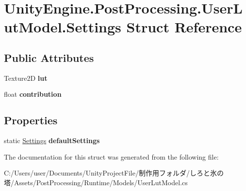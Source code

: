 \hypertarget{struct_unity_engine_1_1_post_processing_1_1_user_lut_model_1_1_settings}{}\section{Unity\+Engine.\+Post\+Processing.\+User\+Lut\+Model.\+Settings Struct Reference}
\label{struct_unity_engine_1_1_post_processing_1_1_user_lut_model_1_1_settings}
\subsection*{Public Attributes}
\begin{DoxyCompactItemize}
\item 
\mbox{\label{struct_unity_engine_1_1_post_processing_1_1_user_lut_model_1_1_settings_aacc55b006872312dfb56a19ec8b5e68a}} 
Texture2D {\bfseries lut}
\item 
\mbox{\label{struct_unity_engine_1_1_post_processing_1_1_user_lut_model_1_1_settings_aa1524dac501bc6c330d2e25298f1ddbd}} 
float {\bfseries contribution}
\end{DoxyCompactItemize}
\subsection*{Properties}
\begin{DoxyCompactItemize}
\item 
\mbox{\label{struct_unity_engine_1_1_post_processing_1_1_user_lut_model_1_1_settings_a9a4da996a1688ccaa11527b45937e91b}} 
static \hyperlink{struct_unity_engine_1_1_post_processing_1_1_user_lut_model_1_1_settings}{Settings} {\bfseries default\+Settings}
\end{DoxyCompactItemize}


The documentation for this struct was generated from the following file\+:\begin{DoxyCompactItemize}
\item 
C\+:/\+Users/user/\+Documents/\+Unity\+Project\+File/制作用フォルダ/しろと氷の塔/\+Assets/\+Post\+Processing/\+Runtime/\+Models/User\+Lut\+Model.\+cs\end{DoxyCompactItemize}
